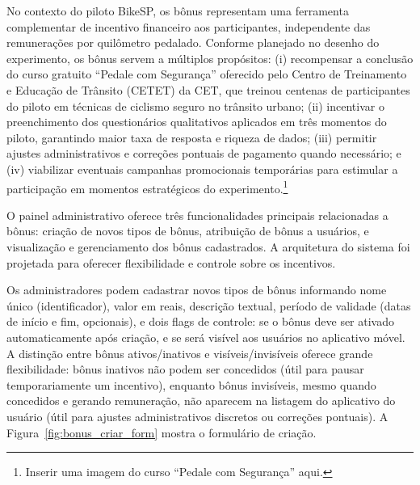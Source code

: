 

No contexto do piloto BikeSP, os bônus
representam uma ferramenta complementar de incentivo financeiro aos participantes,
independente das remunerações por quilômetro pedalado. Conforme planejado no desenho
do experimento, os bônus servem a múltiplos propósitos: (i) recompensar a conclusão
do curso gratuito ``Pedale com Segurança'' oferecido pelo Centro de Treinamento e
Educação de Trânsito (CETET) da CET, que treinou centenas de participantes do piloto em técnicas de ciclismo seguro no trânsito urbano; (ii) incentivar o preenchimento dos
questionários qualitativos aplicados em três momentos do piloto, garantindo maior
taxa de resposta e riqueza de dados; (iii) permitir ajustes administrativos e
correções pontuais de pagamento quando necessário; e (iv) viabilizar eventuais
campanhas promocionais temporárias para estimular a participação em momentos
estratégicos do experimento.\footnote{Inserir uma imagem do curso ``Pedale com Segurança'' aqui.}

O painel administrativo oferece três
funcionalidades principais relacionadas a bônus: criação de novos tipos de bônus,
atribuição de bônus a usuários, e visualização e gerenciamento dos bônus
cadastrados. A arquitetura do sistema foi projetada para oferecer flexibilidade e controle sobre os incentivos.

Os administradores podem cadastrar novos tipos de bônus
informando nome único (identificador), valor em reais, descrição textual, período
de validade (datas de início e fim, opcionais), e dois flags de controle: se o
bônus deve ser ativado automaticamente após criação, e se será visível aos
usuários no aplicativo móvel. A distinção entre bônus ativos/inativos e
visíveis/invisíveis oferece grande flexibilidade: bônus inativos não podem ser
concedidos (útil para pausar temporariamente um incentivo), enquanto bônus
invisíveis, mesmo quando concedidos e gerando remuneração, não aparecem na
listagem do aplicativo do usuário (útil para ajustes administrativos discretos ou
correções pontuais). A Figura~\ref{fig:bonus_criar_form} mostra o formulário de criação.

